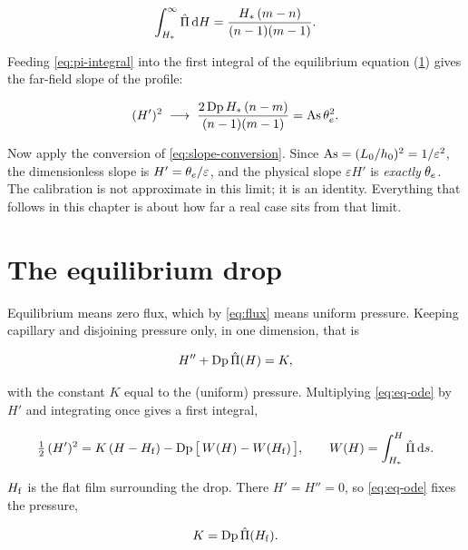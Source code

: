 \begin{equation}\label{eq:pi-integral}
  \int_{H_{*}}^{\infty} \hat{\Pi}\,\mathrm{d}H
    = \frac{H_{*}\,(m-n)}{(n-1)(m-1)}.
\end{equation}

Feeding \cref{eq:pi-integral} into the first integral of the equilibrium
equation (\cref{sec:wetting:equilibrium}) gives the far-field slope of the
profile:

\begin{equation}\label{eq:slope-limit}
  (H')^{2} \;\longrightarrow\;
    \frac{2\,\mathrm{Dp}\,H_{*}\,(n-m)}{(n-1)(m-1)} = \mathrm{As}\,\theta_{e}^{2}.
\end{equation}

Now apply the conversion of \cref{eq:slope-conversion}. Since
$\mathrm{As} = (L_0/h_0)^{2} = 1/\varepsilon^{2}$, the dimensionless slope is
$H' = \theta_{e}/\varepsilon$, and the physical slope $\varepsilon H'$ is
\emph{exactly} $\theta_{e}$. The calibration is not approximate in this limit; it
is an identity. Everything that follows in this chapter is about how far a real
case sits from that limit.

\section{The equilibrium drop}
\label{sec:wetting:equilibrium}

Equilibrium means zero flux, which by \cref{eq:flux} means uniform pressure.
Keeping capillary and disjoining pressure only, in one dimension, that is

\begin{equation}\label{eq:eq-ode}
  H'' + \mathrm{Dp}\,\hat{\Pi}(H) = K,
\end{equation}

with the constant $K$ equal to the (uniform) pressure. Multiplying
\cref{eq:eq-ode} by $H'$ and integrating once gives a first integral,

\begin{equation}\label{eq:first-integral}
  \tfrac{1}{2}\,(H')^{2}
    = K\,(H - H_{\mathrm{f}}) - \mathrm{Dp}\,\bigl[\,W(H) - W(H_{\mathrm{f}})\,\bigr],
  \qquad
  W(H) = \int_{H_{*}}^{H} \hat{\Pi}\,\mathrm{d}s .
\end{equation}

$H_{\mathrm{f}}$ is the flat film surrounding the drop. There $H' = H'' = 0$, so
\cref{eq:eq-ode} fixes the pressure,

\begin{equation}\label{eq:K-from-Hf}
  K = \mathrm{Dp}\,\hat{\Pi}(H_{\mathrm{f}}).
\end{equation}

